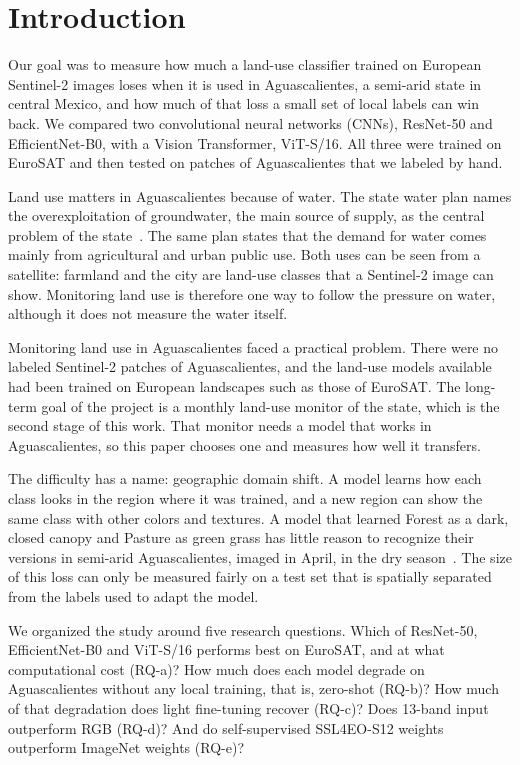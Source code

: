 \section{Introduction}\label{sec:introduction}

Our goal was to measure how much a land-use classifier trained on European Sentinel-2 images
loses when it is used in Aguascalientes, a semi-arid state in central Mexico, and how much of
that loss a small set of local labels can win back. We compared two convolutional neural
networks (CNNs), ResNet-50 and EfficientNet-B0, with a Vision Transformer, ViT-S/16. All three
were trained on EuroSAT and then tested on patches of Aguascalientes that we labeled by hand.

Land use matters in Aguascalientes because of water. The state water plan names the
overexploitation of groundwater, the main source of supply, as the central problem of the
state~\cite{inagua2022planhidrico}. The same plan states that the demand for water comes mainly
from agricultural and urban public use. Both uses can be seen from a satellite: farmland and the
city are land-use classes that a Sentinel-2 image can show. Monitoring land use is therefore one
way to follow the pressure on water, although it does not measure the water itself.

Monitoring land use in Aguascalientes faced a practical problem. There were no labeled Sentinel-2 patches of Aguascalientes,
and the land-use models available had been trained on European landscapes such as those of
EuroSAT. The long-term goal of the project is a monthly land-use monitor of the state, which is
the second stage of this work. That monitor needs a model that works in Aguascalientes, so this
paper chooses one and measures how well it transfers.

The difficulty has a name: geographic domain shift. A model learns how each class looks in the
region where it was trained, and a new region can show the same class with other colors and
textures. A model that learned Forest as a dark, closed canopy and Pasture as green grass has
little reason to recognize their versions in semi-arid Aguascalientes, imaged in April, in the
dry season~\cite{inagua2022planhidrico}. The size of this loss can only be measured
fairly on a test set that is spatially separated from the labels used to adapt the model.

We organized the study around five research questions. Which of ResNet-50, EfficientNet-B0 and
ViT-S/16 performs best on EuroSAT, and at what computational cost (RQ-a)? How much does each
model degrade on Aguascalientes without any local training, that is, zero-shot (RQ-b)? How much
of that degradation does light fine-tuning recover (RQ-c)? Does 13-band input outperform RGB
(RQ-d)? And do self-supervised SSL4EO-S12 weights outperform ImageNet weights (RQ-e)?

